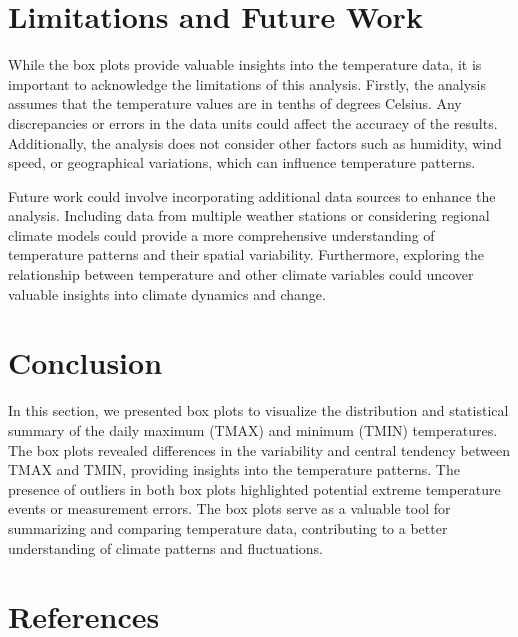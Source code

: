 \documentclass{article}
\begin{document}
\section{Limitations and Future Work}

While the box plots provide valuable insights into the temperature data, it is important to acknowledge the limitations of this analysis. Firstly, the analysis assumes that the temperature values are in tenths of degrees Celsius. Any discrepancies or errors in the data units could affect the accuracy of the results. Additionally, the analysis does not consider other factors such as humidity, wind speed, or geographical variations, which can influence temperature patterns.

Future work could involve incorporating additional data sources to enhance the analysis. Including data from multiple weather stations or considering regional climate models could provide a more comprehensive understanding of temperature patterns and their spatial variability. Furthermore, exploring the relationship between temperature and other climate variables could uncover valuable insights into climate dynamics and change.

\section{Conclusion}

In this section, we presented box plots to visualize the distribution and statistical summary of the daily maximum (TMAX) and minimum (TMIN) temperatures. The box plots revealed differences in the variability and central tendency between TMAX and TMIN, providing insights into the temperature patterns. The presence of outliers in both box plots highlighted potential extreme temperature events or measurement errors. The box plots serve as a valuable tool for summarizing and comparing temperature data, contributing to a better understanding of climate patterns and fluctuations.

\section*{References}
\end{document}
